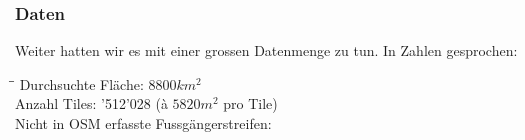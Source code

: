 \subsubsection{Daten}
Weiter hatten wir es mit einer grossen Datenmenge zu tun. In Zahlen gesprochen:
\begin{tabbing}
    \hspace*{8cm}\=\hspace*{4cm}\= \kill
    Durchsuchte Fläche: \> $8800 km^{2}$  \\
    Anzahl Tiles: '512'028 (à $5820 m^{2}$ pro Tile)\\
    Nicht in OSM erfasste Fussgängerstreifen: \\
\end{tabbing}	